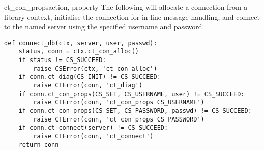 \begin{methoddesc}[CS_CONNECTION]{ct_con_props}{action, property }
The following will allocate a connection from a library context,
initialise the connection for in-line message handling, and connect to
the named server using the specified username and password.

\begin{verbatim}
def connect_db(ctx, server, user, passwd):
    status, conn = ctx.ct_con_alloc()
    if status != CS_SUCCEED:
        raise CSError(ctx, 'ct_con_alloc')
    if conn.ct_diag(CS_INIT) != CS_SUCCEED:
        raise CTError(conn, 'ct_diag')
    if conn.ct_con_props(CS_SET, CS_USERNAME, user) != CS_SUCCEED:
        raise CTError(conn, 'ct_con_props CS_USERNAME')
    if conn.ct_con_props(CS_SET, CS_PASSWORD, passwd) != CS_SUCCEED:
        raise CTError(conn, 'ct_con_props CS_PASSWORD')
    if conn.ct_connect(server) != CS_SUCCEED:
        raise CTError(conn, 'ct_connect')
    return conn
\end{verbatim}
\end{methoddesc}


